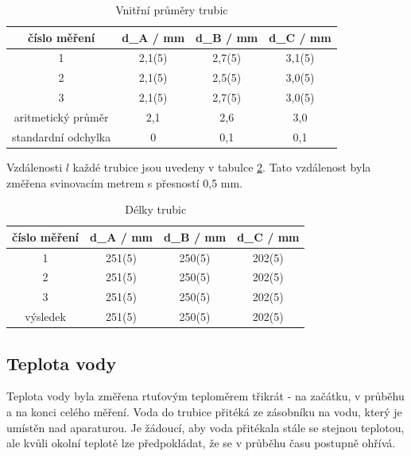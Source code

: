     \begin{table}[h]
        \centering
        \caption{Vnitřní průměry trubic}
        \label{tab:prumery}
        \begin{tabular}{|c|c|c|c|} 
        \hline
            číslo měření & d_A / mm & d_B / mm & d_C / mm  \\ 
        \hline
            1            & 2,1(5)    & 2,7(5)    & 3,1(5)   \\
            2            & 2,1(5)    & 2,5(5)    & 3,0(5)   \\
            3            & 2,1(5)    & 2,7(5)    & 3,0(5)   \\ 
        \hline
            aritmetický průměr   & 2,1       & 2,6       & 3,0         \\
            standardní odchylka        & 0       & 0,1       & 0,1     \\
        \hline
        \end{tabular}
    \end{table}

    Vzdálenosti \(l\) každé trubice jsou uvedeny v tabulce \ref{tab:délky}. Tato vzdálenost byla změřena svinovacím metrem s přesností 0,5 mm.

    \begin{table}[h]
        \centering
        \caption{Délky trubic}
        \label{tab:délky}
        \begin{tabular}{|c|c|c|c|} 
        \hline
            číslo měření & d_A / mm & d_B / mm & d_C / mm  \\ 
        \hline
            1            & 251(5)    & 250(5)    & 202(5)   \\
            2            & 251(5)    & 250(5)    & 202(5)   \\
            3            & 251(5)    & 250(5)    & 202(5)   \\ 
        \hline
            výsledek     & 251(5)    & 250(5)    & 202(5)   \\
        \hline
        \end{tabular}
    \end{table}
\newpage

\subsection{Teplota vody}

    Teplota vody byla změřena rtuťovým teploměrem třikrát - na začátku, v průběhu a na konci celého měření. Voda do trubice přitéká ze zásobníku na vodu, který je umístěn nad aparaturou. Je žádoucí, aby voda přitékala stále se stejnou teplotou, ale kvůli okolní teplotě lze předpokládat, že se v průběhu času postupně ohřívá.


